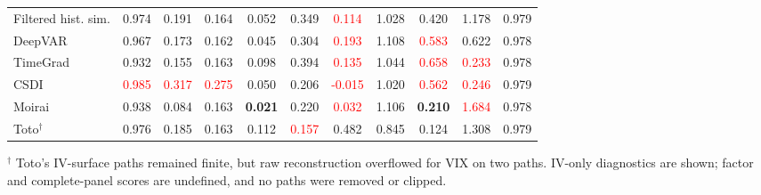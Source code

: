 \begin{table}[H]
{\begin{tabular}{@{}lcccccccccc@{}}
Filtered hist. sim. & 0.974 & 0.191 & 0.164 & 0.052 & 0.349 & \textcolor{red}{0.114} & 1.028 & 0.420 & 1.178 & 0.979 \\
DeepVAR & 0.967 & 0.173 & 0.162 & 0.045 & 0.304 & \textcolor{red}{0.193} & 1.108 & \textcolor{red}{0.583} & 0.622 & 0.978 \\
TimeGrad & 0.932 & 0.155 & 0.163 & 0.098 & 0.394 & \textcolor{red}{0.135} & 1.044 & \textcolor{red}{0.658} & \textcolor{red}{0.233} & 0.978 \\
CSDI & \textcolor{red}{0.985} & \textcolor{red}{0.317} & \textcolor{red}{0.275} & 0.050 & 0.206 & \textcolor{red}{-0.015} & 1.020 & \textcolor{red}{0.562} & \textcolor{red}{0.246} & 0.979 \\
Moirai & 0.938 & 0.084 & 0.163 & \textbf{0.021} & 0.220 & \textcolor{red}{0.032} & 1.106 & \textbf{0.210} & \textcolor{red}{1.684} & 0.978 \\
Toto$^\dagger$ & 0.976 & 0.185 & 0.163 & 0.112 & \textcolor{red}{0.157} & 0.482 & 0.845 & 0.124 & 1.308 & 0.979 \\
\bottomrule
\end{tabular}%
}
\vspace{0pt}

\begin{minipage}{\textwidth}
\scriptsize\raggedright
$^\dagger$ Toto's IV-surface paths remained finite, but raw reconstruction
overflowed for VIX on two paths. IV-only diagnostics are shown; factor and
complete-panel scores are undefined, and no paths were removed or clipped.
\end{minipage}
\end{table}

